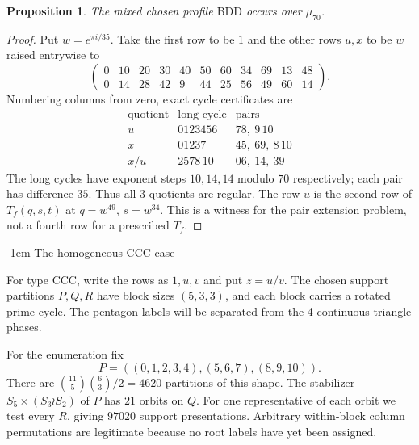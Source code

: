 \documentclass[11pt,a4paper]{article}
\makeatletter
\newtheorem{proposition}[theorem]{Proposition}
\theoremstyle{plain}
\theoremstyle{definition}
\theoremstyle{plain}
\renewcommand\subsection{\@startsection{subsection}{2}{\z@}  {\medskipamount}  {-1em}  {\normalfont\normalsize\bfseries}}
\makeatother
\begin{document}
\par\addvspace{\medskipamount}\noindent
\begin{minipage}{\linewidth}
\begin{proposition}\label{bbb_common:BDD}
The mixed chosen profile $\mathrm{BDD}$ occurs over $\mu_{70}$.
\end{proposition}
\end{minipage}
\par\addvspace{\medskipamount}

\begin{proof}
Put $w=e^{\pi i/35}$. Take the first row to be $1$ and the other rows $u,x$ to be $w$ raised entrywise to
$$\begin{pmatrix}
0&10&20&30&40&50&60&34&69&13&48\\
0&14&28&42&9&44&25&56&49&60&14
\end{pmatrix}.$$
Numbering columns from zero, exact cycle certificates are
$$\begin{array}{c|c|c}
\text{quotient}&\text{long cycle}&\text{pairs}\\\hline
u&0123456&78,\ 9\,10\\
x&01237&45,\ 69,\ 8\,10\\
x/u&2578\,10&06,\ 14,\ 39
\end{array}$$
The long cycles have exponent steps $10,14,14$ modulo $70$ respectively; each pair has difference $35$. Thus all $3$ quotients are regular. The row $u$ is the second row of $T_f(q,s,t)$ at $q=w^{49}$, $s=w^{34}$. This is a witness for the pair extension problem, not a fourth row for a prescribed $T_f$.
\end{proof}

\subsection{The homogeneous CCC case}\label{sec:CCC}

\medskip
For type $\mathrm{CCC}$, write the rows as $1,u,v$ and put $z=u/v$. The chosen support partitions $P,Q,R$ have block sizes $(5,3,3)$, and each block carries a rotated prime cycle. The pentagon labels will be separated from the 4 continuous triangle phases.

For the enumeration fix
$$P=((0,1,2,3,4),(5,6,7),(8,9,10)).$$
There are $\binom{11}{5}\binom63/2=4620$ partitions of this shape. The stabilizer $S_5\times(S_3\wr S_2)$ of $P$ has $21$ orbits on $Q$. For one representative of each orbit we test every $R$, giving $97020$ support presentations. Arbitrary within-block column permutations are legitimate because no root labels have yet been assigned.
\end{document}
